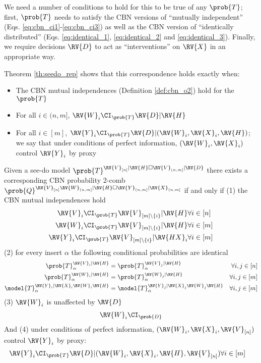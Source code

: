We need a number of conditions to hold for this to be true of any $\prob{T}$; first, $\prob{T}$ needs to satisfy the CBN versions of ``mutually independent'' (Eqs. \ref{eq:cbn_ci1}-\ref{eq:cbn_ci3}) as well as the CBN version of ``identically distributed'' (Eqs. \ref{eq:identical_1}, \ref{eq:identical_2} and \ref{eq:identical_3}). Finally, we require decisions $\RV{D}$ to act as ``interventions'' on $\RV{X}$ in an appropriate way.

Theorem \ref{th:seedo_rep} shows that this correspondence holds exactly when:
\begin{itemize}
    \item The CBN mutual independences (Definition \ref{def:cbn_o2}) hold for the $\prob{T}$
    \item For all $i\in (n,m]$, $\RV{W}_i\CI_{\prob{T}}\RV{D}|\RV{H}$
    \item For all $i\in [m]$, $\RV{Y}_i\CI_{\prob{T}}\RV{D}|(\RV{W}_i,\RV{X}_i,\RV{H})$; we say that under conditions of perfect information, $(\RV{W}_i,\RV{X}_i)$ control $\RV{Y}_i$ by proxy
\end{itemize}

\begin{theorem}\label{th:seedo_rep}
Given a see-do model $\prob{T}^{\RV{V}_{[n]}|\RV{H}\square \RV{V}_{(n,m]}|\RV{D}}$ there exists a corresponding CBN probability 2-comb $\prob{Q}^{\RV{V}_{[n]}\RV{W}_{(n,m]}|\RV{H}\square \RV{Y}_{(n,m]}|\RV{X}_{(n,m]}}$ if and only if (1) the CBN mutual independences hold
\begin{align}
    \RV{V}_i\CI_{\prob{T}} \RV{V}_{[m]\setminus \{i\}}|\RV{H}&\forall i\in [n]\\
    \RV{W}_i\CI_{\prob{T}} \RV{V}_{[m]\setminus \{i\}}|\RV{H}&\forall i\in [m]\\
    \RV{Y}_i\CI_{\prob{T}} \RV{V}_{[m]\setminus \{i\}}|\RV{HX}_i&\forall i\in [m]\\
\end{align}
(2) for every insert $\alpha$ the following conditional probabilities are identical
\begin{align}
    \prob{T}_\alpha^{\RV{V}_i|\RV{H}} &= \prob{T}_\alpha^{\RV{V}_j|\RV{H}}&\forall i,j\in [n]\\
    \prob{T}_\alpha^{\RV{W}_i|\RV{H}} &= \prob{T}_\alpha^{\RV{W}_j|\RV{H}}&\forall i,j\in [m]\\
    \model{T}_\alpha^{\RV{Y}_i|\RV{X}_i\RV{W}_i\RV{H}} &= \model{T}_\alpha^{\RV{Y}_j|\RV{X}_j\RV{W}_j\RV{H}}&\forall i,j\in [m]
\end{align}
(3) $\RV{W}_i$ is unaffected by $\RV{D}$
\begin{align}
    \RV{W}_i\CI_{\prob{D}}
\end{align}
And (4) under conditions of perfect information, $(\RV{W}_i,\RV{X}_i,\RV{V}_{[n]})$ control $\RV{Y}_i$ by proxy:
\begin{align}
    \RV{Y}_i\CI_{\prob{T}}\RV{D}|(\RV{W}_i,\RV{X}_i,\RV{H},\RV{V}_{[n]})&\forall i\in [m]
\end{align}
\end{theorem}

